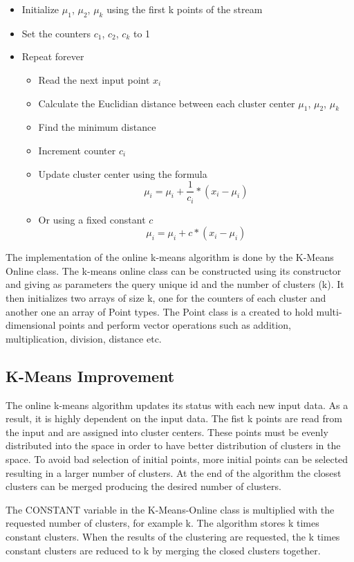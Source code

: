 \documentclass{lmproj}
\begin{document}
\begin{itemize}
	\item Initialize $\mu_{1}$, $\mu_{2}$, $\mu_{k}$  using the first k points of the stream
	\item Set the counters $c_{1}$, $c_{2}$, $c_{k}$  to 1
	\item Repeat forever
	\begin{itemize}
	\item Read the next input point $x_{i}$
	\item Calculate the Euclidian distance between each cluster center $\mu_{1}$, $\mu_{2}$, $\mu_{k}$
	\item Find the minimum distance
	\item Increment counter $c_{i}$
	\item Update cluster center using the formula
	\[ \mu_{i} = \mu_{i} + \frac{1}{c_{i}} * (x_{i} - \mu_{i} )\]
	\item Or using a fixed constant $c$
	\[ \mu_{i} = \mu_{i} + c * (x_{i} - \mu_{i} )\]
	\end{itemize}
\end{itemize}

The implementation of the online k-means algorithm is done by the K-Means Online class. The k-means online class can be constructed using its constructor and giving as parameters the query unique id and the number of clusters (k). It then initializes two arrays of size k, one for the counters of each cluster and another one an array of Point types. The Point class is a created to hold multi-dimensional points and perform vector operations such as addition, multiplication, division, distance etc. 

\subsection{K-Means Improvement}

The online k-means algorithm updates its status with each new input data. As a result, it is highly dependent on the input data. The fist k points are read from the input and are assigned into cluster centers. These points must be evenly distributed into the space in order to have better distribution of clusters in the space. To avoid bad selection of initial points, more initial points can be selected resulting in a larger number of clusters. At the end of the algorithm the closest clusters can be merged producing the desired number of clusters.

The CONSTANT variable in the K-Means-Online class is multiplied with the requested number of clusters, for example k. The algorithm stores k times constant clusters. When the results of the clustering are requested, the k times constant clusters are reduced to k by merging the closed clusters together.
\end{document}
